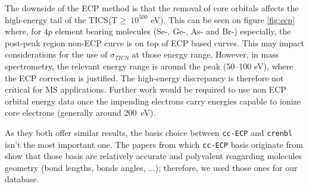 \documentclass[article,preview]{planetary}
\begin{document}
The downside of the ECP method is that the removal of core orbitals affects the high-energy tail of the TICS(T$\geq~10^500$ eV). This can be seen on figure \ref{fig:ecp} where, for $4p$ element bearing molecules (Se-, Ge-, As- and Br-) especially, the post-peak region non-ECP curve is on top of ECP based curves. This may impact considerations for the use of $\sigma_{TICS}$ at those energy range. However, in mass spectrometry, the relevant energy range is around the peak (50–100 eV), where the ECP correction is justified. The high-energy discrepancy is therefore not critical for MS applications. Further work would be required to use non ECP orbital energy data once the impending electrons carry energies capable to ionize core electrons (generally around 200~eV).
\begin{table}[H]
    \centering
    \caption{\textbf{Mean $\Delta$ of TICS between ECP and non-ECP calculations for $3p$ and $4p$ elements bearing molecules.}}
    \label{tab:ecp}
\end{table}
As they both offer similar results, the basis choice between \verb|cc-ECP| and \verb|crenbl| isn't the most important one. The papers from which \verb|cc-ECP| basis originate from \textcite{bennettNewGenerationEffective2018,wangFe3dOrbital2025} show that those basis are relatively accurate and polyvalent reagarding molecules geometry (bond lengths, bonds angles, ...); therefore, we used those ones for our database.
\end{document}
